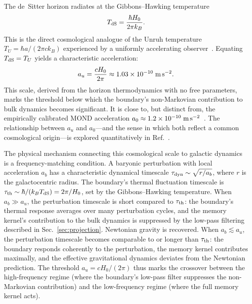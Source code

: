 \documentclass[aps,prd,twocolumn,superscriptaddress,nofootinbib]{revtex4-2}
\begin{document}
The de~Sitter horizon radiates at the Gibbons--Hawking temperature~\cite{GibbonsHawking1977}
\begin{equation}
T_{\rm dS} = \frac{\hbar H_0}{2\pi k_B}.
\label{eq:TdS}
\end{equation}
This is the direct cosmological analogue of the Unruh temperature $T_U = \hbar a/(2\pi c k_B)$ experienced by a uniformly accelerating observer~\cite{Unruh1976}. Equating $T_{\rm dS} = T_U$ yields a characteristic acceleration:
\begin{equation}
a_u = \frac{cH_0}{2\pi} \approx 1.03 \times 10^{-10}\;\text{m\,s}^{-2}.
\label{eq:au_derived}
\end{equation}
This scale, derived from the horizon thermodynamics with no free parameters, marks the threshold below which the boundary's non-Markovian contribution to bulk dynamics becomes significant. It is close to, but distinct from, the empirically calibrated MOND acceleration $a_0 \approx 1.2 \times 10^{-10}\;\text{m\,s}^{-2}$~\cite{Milgrom1983,McGaugh2016SPARC}. The relationship between $a_u$ and $a_0$---and the sense in which both reflect a common cosmological origin---is explored quantitatively in Ref.~\cite{PaperI}.

The physical mechanism connecting this cosmological scale to galactic dynamics is a frequency-matching condition. A baryonic perturbation with local acceleration $a_b$ has a characteristic dynamical timescale $\tau_{\rm dyn} \sim \sqrt{r/a_b}$, where $r$ is the galactocentric radius. The boundary's thermal fluctuation timescale is $\tau_{\rm th} \sim \hbar/(k_B T_{\rm dS}) = 2\pi/H_0$, set by the Gibbons--Hawking temperature. When $a_b \gg a_u$, the perturbation timescale is short compared to $\tau_{\rm th}$: the boundary's thermal response averages over many perturbation cycles, and the memory kernel's contribution to the bulk dynamics is suppressed by the low-pass filtering described in Sec.~\ref{sec:projection}. Newtonian gravity is recovered. When $a_b \lesssim a_u$, the perturbation timescale becomes comparable to or longer than $\tau_{\rm th}$: the boundary responds coherently to the perturbation, the memory kernel contributes maximally, and the effective gravitational dynamics deviates from the Newtonian prediction. The threshold $a_u = cH_0/(2\pi)$ thus marks the crossover between the high-frequency regime (where the boundary's low-pass filter suppresses the non-Markovian contribution) and the low-frequency regime (where the full memory kernel acts).
\end{document}
